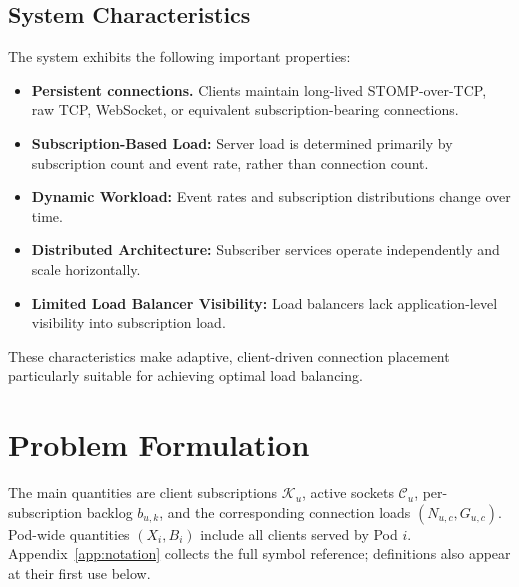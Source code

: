 \documentclass[manuscript,nonacm]{acmart}
\begin{document}
\subsection{System Characteristics}

The system exhibits the following important properties:

\begin{itemize}
	
	\item \textbf{Persistent connections.} Clients maintain long-lived STOMP-over-TCP,
	raw TCP, WebSocket, or equivalent subscription-bearing connections.
	
	\item \textbf{Subscription-Based Load:} Server load is determined primarily by subscription count and event rate, rather than connection count.
	
	\item \textbf{Dynamic Workload:} Event rates and subscription distributions change over time.
	
	\item \textbf{Distributed Architecture:} Subscriber services operate independently and scale horizontally.
	
	\item \textbf{Limited Load Balancer Visibility:} Load balancers lack application-level visibility into subscription load.
	
\end{itemize}

These characteristics make adaptive, client-driven connection placement particularly suitable for achieving optimal load balancing.




\section{Problem Formulation}
\label{sec:problem-formulation}

The main quantities are client subscriptions $\mathcal{K}_u$, active sockets
$\mathcal{C}_u$, per-subscription backlog $b_{u,k}$, and the corresponding
connection loads $(N_{u,c},G_{u,c})$. Pod-wide quantities $(X_i,B_i)$ include
all clients served by Pod $i$. Appendix~\ref{app:notation} collects the full
symbol reference; definitions also appear at their first use below.
\end{document}
